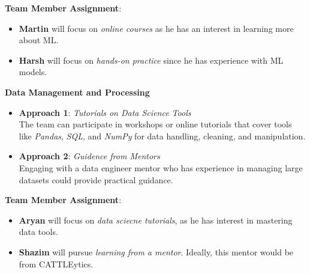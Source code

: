 \documentclass[12pt]{article}
\begin{document}
\textbf{Team Member Assignment}:
\begin{itemize}
    \item \textbf{Martin} will focus on \textit{online courses} as he has an 
    interest in learning more about ML.
    \item \textbf{Harsh} will focus on \textit{hands-on practice} since he has 
    experience with ML models.
\end{itemize}

\textbf{Data Management and Processing}

\begin{itemize}
    \item \textbf{Approach 1}: \textit{Tutorials on Data Science Tools} \\
    The team can participate in workshops or online tutorials that cover tools 
    like \textit{Pandas}, \textit{SQL}, and \textit{NumPy} for data handling, 
    cleaning, and manipulation.
    \item \textbf{Approach 2}: \textit{Guidence from Mentors} \\
    Engaging with a data engineer mentor who has experience in managing large 
    datasets could provide practical guidance. 
\end{itemize}

\textbf{Team Member Assignment}:
\begin{itemize}
    \item \textbf{Aryan} will focus on \textit{data sciecne tutorials}, as he 
    has interest in mastering data tools.
    \item \textbf{Shazim} will pursue \textit{learning from a mentor}. Ideally, 
    this mentor would be from CATTLEytics.
\end{itemize}
\end{document}
